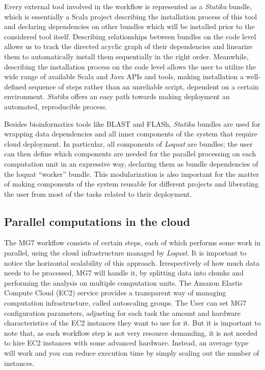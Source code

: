 \documentclass[fleqn,10pt,lineno]{wlpeerj}
\begin{document}
Every external tool involved in the workflow is represented as a
\emph{Statika} bundle, which is essentially a Scala project describing
the installation process of this tool and declaring dependencies on
other bundles which will be installed prior to the considered tool
itself. Describing relationships between bundles on the code level
allows us to track the directed acyclic graph of their dependencies and
linearize them to automatically install them sequentially in the right
order. Meanwhile, describing the installation process on the code level
allows the user to utilize the wide range of available Scala and Java
APIs and tools, making installation a well-defined sequence of steps
rather than an unreliable script, dependent on a certain environment.
\emph{Statika} offers an easy path towards making deployment an
automated, reproducible process.

Besides bioinformatics tools like BLAST and FLASh, \emph{Statika}
bundles are used for wrapping data dependencies and all inner components
of the system that require cloud deployment. In particular, all
components of \emph{Loquat} are bundles; the user can then define which
components are needed for the parallel processing on each computation
unit in an expressive way, declaring them as bundle dependencies of the
loquat ``worker'' bundle. This modularization is also important for the
matter of making components of the system reusable for different
projects and liberating the user from most of the tasks related to their
deployment.

\subsection{Parallel computations in the
cloud}\label{parallel-computations-in-the-cloud}

The MG7 workflow consists of certain steps, each of which performs some
work in parallel, using the cloud infrastructure managed by
\emph{Loquat}. It is important to notice the horizontal scalability of
this approach. Irrespectively of how much data needs to be processed,
MG7 will handle it, by splitting data into chunks and performing the
analysis on multiple computation units. The Amazon Elastic Compute Cloud
(EC2) service provides a transparent way of managing computation
infrastructure, called autoscaling groups. The User can set MG7
configuration parameters, adjusting for each task the amount and
hardware characteristics of the EC2 instances they want to use for it.
But it is important to note that, as each workflow step is not very
resource demanding, it is not needed to hire EC2 instances with some
advanced hardware. Instead, an average type will work and you can reduce
execution time by simply scaling out the number of instances.
\end{document}
